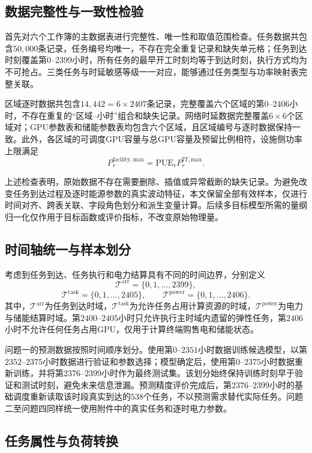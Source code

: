 \documentclass[UTF8,a4paper,zihao=-4]{ctexart}
\begin{document}
\subsection{数据完整性与一致性检验}

首先对六个工作簿的主数据表进行完整性、唯一性和取值范围检查。任务数据共包含$50{,}000$条记录，任务编号均唯一，不存在完全重复记录和缺失单元格；任务到达时刻覆盖第$0$--$2399$小时，所有任务的最早开工时刻均等于到达时刻，执行方式均为不可抢占。三类任务与时延敏感等级一一对应，能够通过任务类型与功率映射表完整关联。

区域逐时数据共包含$14{,}442=6\times2407$条记录，完整覆盖六个区域的第$0$--$2406$小时，不存在重复的“区域--小时”组合和缺失记录。网络时延数据完整覆盖$6\times6$个区域对；GPU参数表和储能参数表均包含六个区域，且区域编号与逐时数据保持一致。此外，各区域的可调度GPU容量与总GPU容量及预留比例相符，设施侧功率上限满足
\[
P_{r}^{\mathrm{facility,max}}
=
\mathrm{PUE}_{r}P_{r}^{\mathrm{IT,max}}.
\]

上述检查表明，原始数据不存在需要删除、插值或异常截断的缺失记录。为避免改变任务到达过程及逐时能源参数的真实波动特征，本文保留全部有效样本，仅进行时间对齐、跨表关联、字段角色划分和派生变量计算。后续多目标模型所需的量纲归一化仅作用于目标函数或评价指标，不改变原始物理量。

\subsection{时间轴统一与样本划分}

考虑到任务到达、任务执行和电力结算具有不同的时间边界，分别定义
\[
\mathcal{T}^{\mathrm{arr}}=\{0,1,\ldots,2399\},
\]
\[
\mathcal{T}^{\mathrm{task}}=\{0,1,\ldots,2405\},
\qquad
\mathcal{T}^{\mathrm{power}}=\{0,1,\ldots,2406\}.
\]
其中，$\mathcal{T}^{\mathrm{arr}}$为任务到达时域，$\mathcal{T}^{\mathrm{task}}$为允许任务占用计算资源的时域，$\mathcal{T}^{\mathrm{power}}$为电力与储能结算时域。第$2400$--$2405$小时只允许执行主时域内遗留的弹性任务，第$2406$小时不允许任何任务占用GPU，仅用于计算终端购售电和储能状态。

问题一的预测数据按照时间顺序划分。使用第$0$--$2351$小时数据训练候选模型，以第$2352$--$2375$小时数据进行验证和参数选择；模型确定后，使用第$0$--$2375$小时数据重新训练，并将第$2376$--$2399$小时作为最终测试集。该划分始终保持训练时刻早于验证和测试时刻，避免未来信息泄漏。预测精度评价完成后，第$2376$--$2399$小时的基础调度重新读取该时段真实到达的$538$个任务，不以预测需求替代实际任务。问题二至问题四同样统一使用附件中的真实任务和逐时电力参数。

\subsection{任务属性与负荷转换}
\end{document}
